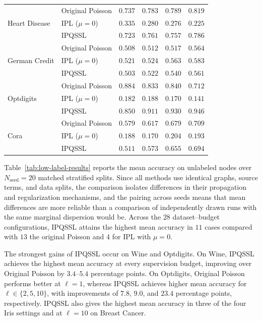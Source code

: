 \documentclass[11pt,a4paper]{article}
\begin{document}
\begin{table}[H]
\begin{tabular}{@{}llcccc@{}}
\multirow{3}{*}{Heart Disease}
& Original Poisson
& $\mathbf{0.737}$ & $\mathbf{0.783}$ & $\mathbf{0.789}$ & $\mathbf{0.819}$ \\
& IPL (\(\mu=0\))
& $0.335$ & $0.280$ & $0.276$ & $0.225$ \\
& \textsc{IPQSSL}
& $0.723$ & $0.761$ & $0.757$ & $0.786$ \\
\midrule

\multirow{3}{*}{German Credit}
& Original Poisson
& $0.508$ & $0.512$ & $0.517$ & $0.564$ \\
& IPL (\(\mu=0\))
& $\mathbf{0.521}$ & $\mathbf{0.524}$ & $\mathbf{0.563}$ & $\mathbf{0.583}$ \\
& \textsc{IPQSSL}
& $0.503$ & $0.522$ & $0.540$ & $0.561$ \\
\midrule

\multirow{3}{*}{Optdigits}
& Original Poisson
& $\mathbf{0.884}$ & $0.833$ & $0.840$ & $0.712$ \\
& IPL (\(\mu=0\))
& $0.182$ & $0.188$ & $0.170$ & $0.141$ \\
& \textsc{IPQSSL}
& $0.850$ & $\mathbf{0.911}$ & $\mathbf{0.930}$ & $\mathbf{0.946}$ \\
\midrule

\multirow{3}{*}{Cora}
& Original Poisson
& $\mathbf{0.579}$ & $\mathbf{0.617}$ & $\mathbf{0.679}$ & $\mathbf{0.709}$ \\
& IPL (\(\mu=0\))
& $0.188$ & $0.170$ & $0.204$ & $0.193$ \\
& \textsc{IPQSSL}
& $0.511$ & $0.573$ & $0.655$ & $0.694$ \\
\bottomrule
\end{tabular}
\end{table}


Table~\ref{tab:low-label-results} reports the mean accuracy
on unlabeled nodes over \(N_{\mathrm{seed}}=20\)
matched stratified splits. Since all
methods use identical graphs, source terms, and data splits, the comparison
isolates differences in their propagation and regularization mechanisms,
and the pairing across seeds means that mean differences are more reliable
than a comparison of independently drawn runs with the same marginal
dispersion would be.
Across the \(28\) dataset--budget configurations, \textsc{IPQSSL} attains
the highest mean accuracy in \(11\) cases compared with \(13\) the original
Poisson and \(4\) for IPL with \(\mu=0\).

The strongest gains of \textsc{IPQSSL} occur on Wine and Optdigits. On Wine,
\textsc{IPQSSL} achieves the highest mean accuracy at every supervision
budget, improving over Original Poisson by \(3.4\)--\(5.4\) percentage
points. On Optdigits, Original Poisson performs better at \(\ell=1\), whereas
\textsc{IPQSSL} achieves higher mean accuracy for
\(\ell\in\{2,5,10\}\), with improvements of \(7.8\), \(9.0\), and
\(23.4\) percentage points, respectively. \textsc{IPQSSL} also gives the
highest mean accuracy in three of the four Iris settings and at
\(\ell=10\) on Breast Cancer.
\end{document}
